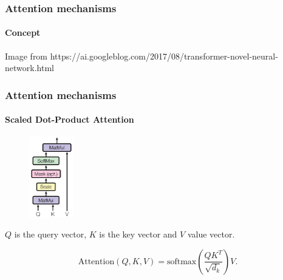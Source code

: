 \documentclass[9pt]{beamer}
\begin{document}
\begin{frame}
  \frametitle{Attention mechanisms}

  \framesubtitle{Concept}

  \begin{figure}

  \end{figure}

  {\tiny Image from https://ai.googleblog.com/2017/08/transformer-novel-neural-network.html}
\end{frame}

\begin{frame}

  \frametitle{Attention mechanisms}

  \framesubtitle{Scaled Dot-Product Attention}

  \begin{figure}
    \includegraphics[height = 3.5cm]{images/dot_product_attention.png}
  \end{figure}

  \medskip

  $Q$ is the query vector, $K$ is the key vector and $V$ value vector.

  \bigskip

  \[
  \text{Attention}(Q, K, V) = \text{softmax}(\frac{QK^{T}}{\sqrt{d_{k}}}) V.
  \]

\end{frame}
\end{document}
